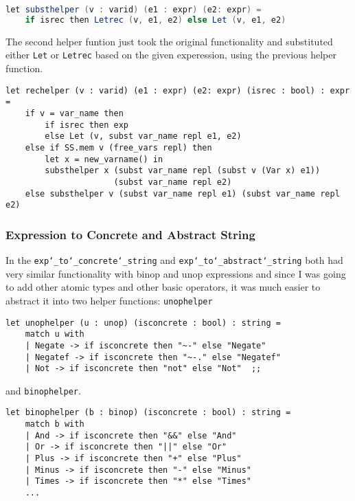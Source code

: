 \documentclass{article}
\begin{document}
\begin{lstlisting}[language=java]
let substhelper (v : varid) (e1 : expr) (e2: expr) =
    if isrec then Letrec (v, e1, e2) else Let (v, e1, e2) 
\end{lstlisting}

The second helper funtion just took the original functionality and substituted either \texttt{Let} or \texttt{Letrec} based on the given experession, using the previous helper function.

\begin{lstlisting}
let rechelper (v : varid) (e1 : expr) (e2: expr) (isrec : bool) : expr =
    if v = var_name then 
        if isrec then exp 
        else Let (v, subst var_name repl e1, e2) 
    else if SS.mem v (free_vars repl) then 
        let x = new_varname() in 
        substhelper x (subst var_name repl (subst v (Var x) e1)) 
                      (subst var_name repl e2)
    else substhelper v (subst var_name repl e1) (subst var_name repl e2)
\end{lstlisting}

\subsubsection{Expression to Concrete and Abstract String}

In the \texttt{exp\char`_to\char`_concrete\char`_string} and \texttt{exp\char`_to\char`_abstract\char`_string} both had very similar functionality with binop and unop expressions and since I 
was going to add other atomic types and other basic operators, it was much easier to abstract it into two helper functions: \texttt{unophelper}

\begin{lstlisting}
let unophelper (u : unop) (isconcrete : bool) : string = 
    match u with
    | Negate -> if isconcrete then "~-" else "Negate" 
    | Negatef -> if isconcrete then "~-." else "Negatef" 
    | Not -> if isconcrete then "not" else "Not"  ;;
\end{lstlisting}

and \texttt{binophelper}.

\begin{lstlisting}
let binophelper (b : binop) (isconcrete : bool) : string = 
    match b with 
    | And -> if isconcrete then "&&" else "And"
    | Or -> if isconcrete then "||" else "Or"
    | Plus -> if isconcrete then "+" else "Plus"
    | Minus -> if isconcrete then "-" else "Minus"
    | Times -> if isconcrete then "*" else "Times"
    ...
\end{lstlisting}
\end{document}
